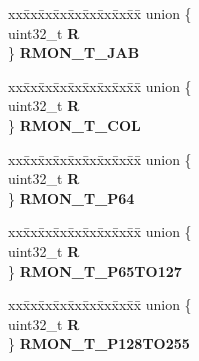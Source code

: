 \begin{DoxyCompactItemize}
\begin{tabbing}
\end{tabbing}\item 
\mbox{\label{structFEC__tag_a60e293ad7bf7a1702a61b5ef99cbbba3}} 
\begin{tabbing}
xx\=xx\=xx\=xx\=xx\=xx\=xx\=xx\=xx\=\kill
union \{\\
\>uint32\_t {\bfseries R}\\
\} {\bfseries RMON\_T\_JAB}\\

\end{tabbing}\item 
\mbox{\label{structFEC__tag_a1090db44bd4639ef79203f916129368d}} 
\begin{tabbing}
xx\=xx\=xx\=xx\=xx\=xx\=xx\=xx\=xx\=\kill
union \{\\
\>uint32\_t {\bfseries R}\\
\} {\bfseries RMON\_T\_COL}\\

\end{tabbing}\item 
\mbox{\label{structFEC__tag_a5f99e0a288f3bca8649a9b59329b1bf1}} 
\begin{tabbing}
xx\=xx\=xx\=xx\=xx\=xx\=xx\=xx\=xx\=\kill
union \{\\
\>uint32\_t {\bfseries R}\\
\} {\bfseries RMON\_T\_P64}\\

\end{tabbing}\item 
\mbox{\label{structFEC__tag_a5d71d8d148f4d7777057dbc64e7a4d66}} 
\begin{tabbing}
xx\=xx\=xx\=xx\=xx\=xx\=xx\=xx\=xx\=\kill
union \{\\
\>uint32\_t {\bfseries R}\\
\} {\bfseries RMON\_T\_P65TO127}\\

\end{tabbing}\item 
\mbox{\label{structFEC__tag_a2d185d09dd4f3f0717320dcbe491fecf}} 
\begin{tabbing}
xx\=xx\=xx\=xx\=xx\=xx\=xx\=xx\=xx\=\kill
union \{\\
\>uint32\_t {\bfseries R}\\
\} {\bfseries RMON\_T\_P128TO255}\\


\end{tabbing}
\end{DoxyCompactItemize}
